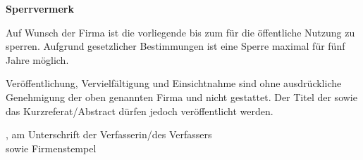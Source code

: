 \thispagestyle{empty}
\textbf{\huge Sperrvermerk}

\vspace{5mm}

Auf Wunsch der Firma                                                                                  \mycompany ist die vorliegende \mykindofthesis bis zum                                                   \myblockinguntil für die öffentliche Nutzung zu sperren. Aufgrund gesetzlicher Bestimmungen ist eine Sperre maximal für fünf Jahre möglich. 

\vspace{5mm}

Veröffentlichung, Vervielfältigung und Einsichtnahme sind ohne ausdrückliche Genehmigung der oben genannten Firma und \myauthor nicht gestattet. Der Titel der \mykindofthesis sowie das Kurzreferat/Abstract dürfen jedoch veröffentlicht werden.

\vspace*{50mm}

\mysubmissiontown, am \mysubmissionday \hspace{1mm} \mysubmissionmonth \hspace{1mm} \mysubmissionyear \hfill Unterschrift der Verfasserin/des Verfassers\\
\hspace*{10cm} sowie Firmenstempel 
